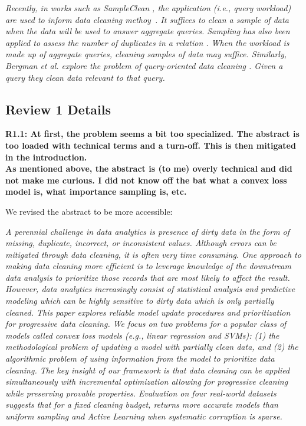 \vspace{0.5em}

\emph{Recently, in works such as SampleClean \cite{wang1999sample}, the application (i.e., query workload) are used to inform data cleaning methoy~.
It suffices to clean a sample of data when the data will be used to answer aggregate queries.
Sampling has also been applied to assess the number of duplicates in a relation \cite{heise2014estimating}.
When the workload is made up of aggregate queries, cleaning samples of data may suffice. 
Similarly, Bergman et al. explore the problem of query-oriented data cleaning \cite{DBLP:conf/sigmod/BergmanMNT15}. Given a query they clean data relevant to that query. }

\subsection*{Review 1 Details} 

\noindent\textbf{R1.1: At first, the problem seems a bit too specialized. The abstract is too loaded with technical terms and a turn-off. This is then mitigated in the introduction. \\
As mentioned above, the abstract is (to me) overly technical and did not make me curious. I did not know off the bat what a convex loss model is, what importance sampling is, etc.}

We revised the abstract to be more accessible:

\emph{A perennial challenge in data analytics is presence of dirty data in the form of missing, duplicate, incorrect, or inconsistent values.
Although errors can be mitigated through data cleaning, it is often very time consuming.
One approach to making data cleaning more efficient is to leverage knowledge of the downstream data analysis to prioritize those records that are most likely to affect the result.
However, data analytics increasingly consist of statistical analysis and predictive modeling which can be highly sensitive to dirty data which is only partially cleaned.
This paper explores reliable model update procedures and prioritization for progressive data cleaning.
We focus on two problems for a popular class of models called convex loss models (e.g., linear regression and SVMs): (1) the methodological problem of updating a model with partially clean data, and (2) the algorithmic problem of using information from the model to prioritize data cleaning.
The key insight of our framework is that data cleaning can be applied simultaneously with incremental optimization allowing for progressive cleaning while preserving provable properties.
Evaluation on four real-world datasets suggests that for a fixed cleaning budget, \sys returns more accurate models than uniform sampling and Active Learning when systematic corruption is sparse. }

